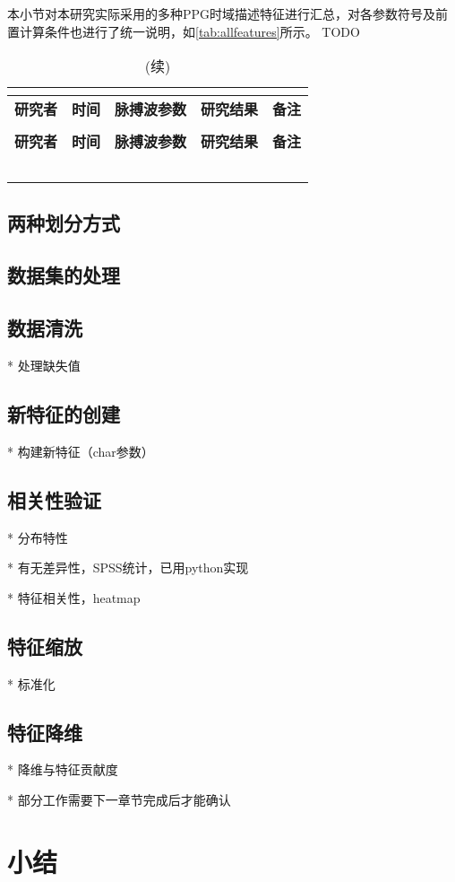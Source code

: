 本小节对本研究实际采用的多种PPG时域描述特征进行汇总，对各参数符号及前置计算条件也进行了统一说明，如\autoref{tab:allfeatures}所示。
TODO
\begin{center}
    \fontsize{10}{4}
    \begin{longtable}{p{3cm}<{\centering}p{1cm}<{\centering}p{2cm}<{\centering}p{6cm}<{\centering}p{1cm}<{\centering}}
        \caption{本研究使用的所有PPG时域指标一览}\\
        \label{tab:allfeatures}\\
        \hline\hline
            \textbf{研究者}&\textbf{时间}&\textbf{脉搏波参数}&\textbf{研究结果}&\textbf{备注}\\
        \hline
        \endfirsthead
        \caption[]{(续)}\\
        \hline
            \textbf{研究者}&\textbf{时间}&\textbf{脉搏波参数}&\textbf{研究结果}&\textbf{备注}\\
        \hline
        \endhead 
        \hline
        \endfoot
        \hline\hline
        \endlastfoot
        &       &       &       &  \\
        &       &       &       &  \\
        &       &       &       &  \\
        &       &       &       &  \\
        &       &       &       &  \\
    \end{longtable}
\end{center}
\subsection{两种划分方式}
\subsection{数据集的处理}

\subsection{数据清洗}
* 处理缺失值

\subsection{新特征的创建}
* 构建新特征（char参数）
\subsection{相关性验证}
* 分布特性

  * 有无差异性，SPSS统计，已用python实现

  * 特征相关性，heatmap
\subsection{特征缩放}
* 标准化
\subsection{特征降维}
* 降维与特征贡献度

* 部分工作需要下一章节完成后才能确认
\section{小结}